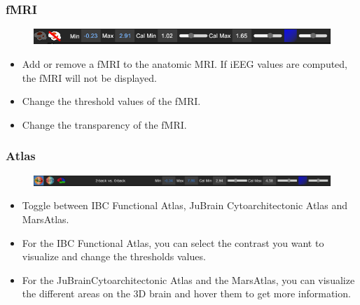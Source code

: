 \documentclass[a4paper]{article}
\begin{document}
\subsubsection{fMRI}
\begin{figure}[H]
\begin{center}
\includegraphics[scale=0.5]{fMRI.png}
\end{center}
\end{figure}
\begin{itemize}
\item Add or remove a fMRI to the anatomic MRI. If iEEG values are computed, the fMRI will not be displayed.
\item Change the threshold values of the fMRI.
\item Change the transparency of the fMRI.
\end{itemize}
\subsubsection{Atlas}
\begin{figure}[H]
\begin{center}
\includegraphics[scale=0.5]{Atlas.png}
\end{center}
\end{figure}
\begin{itemize}
\item Toggle between IBC Functional Atlas, JuBrain Cytoarchitectonic Atlas and MarsAtlas.
\item For the IBC Functional Atlas, you can select the contrast you want to visualize and change the thresholds values.
\item For the JuBrainCytoarchitectonic Atlas and the MarsAtlas, you can visualize the different areas on the 3D brain and hover them to get more information.
\end{itemize}
\end{document}
